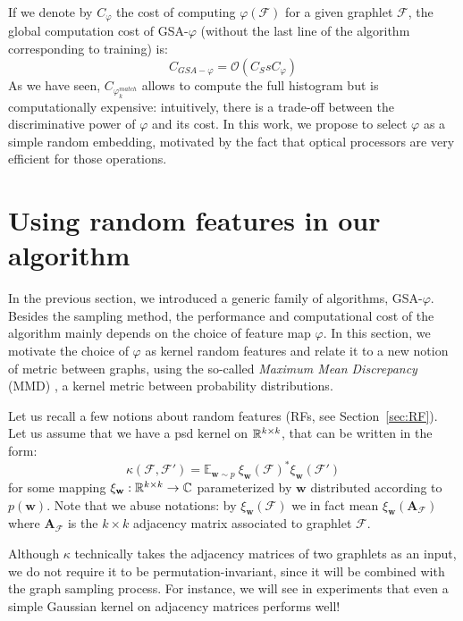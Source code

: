 If we denote by $C_\varphi$ the cost of computing $\varphi(\mathcal{F})$ for a given graphlet $\mathcal{F}$, the global computation cost of GSA-$\varphi$ (without the last line of the algorithm corresponding to training) is:
\begin{equation}
C_{GSA-\varphi} = \mathcal{O}(C_S s C_\varphi)
\end{equation}
As we have seen, $C_{\varphi^{match}_k}$ allows to compute the full histogram but is computationally expensive: intuitively, there is a trade-off between the discriminative power of $\varphi$ and its cost. In this work, we propose to select $\varphi$ as a simple random embedding, motivated by the fact that optical processors are very efficient for those operations. 

\section{Using random features in our algorithm}

In the previous section, we introduced a generic family of algorithms, GSA-$\varphi$. Besides the sampling method, the performance and computational cost of the algorithm mainly depends on the choice of feature map $\varphi$. In this section, we motivate the choice of $\varphi$ as kernel random features  and relate it to a new notion of metric between graphs, using the so-called \emph{Maximum Mean Discrepancy} (MMD) \citep{gretton}, a kernel metric between probability distributions.

Let us recall a few notions about random features (RFs, see Section~\ref{sec:RF}). Let us assume that we have a psd kernel on $\mathbb{R}^{k \times k}$, that can be written in the form:
\begin{equation}
\label{eq:random_features_3}
\kappa(\mathcal{F},\mathcal{F}')= \mathbb{E}_{\mathbf{w} \sim p}~ \xi_\mathbf{w}(\mathcal{F})^* \xi_\mathbf{w}(\mathcal{F}')
\end{equation}
for some mapping $\xi_\mathbf{w} : \mathbb{R}^{k \times k} \to \mathbb{C}$ parameterized by $\mathbf{w}$ distributed according to $p(\mathbf{w})$. Note that we abuse notations: by $\xi_\mathbf{w}(\mathcal{F})$ we in fact mean $\xi_\mathbf{w}(\mathbf{A}_\mathcal{F})$ where $\mathbf{A}_\mathcal{F}$ is the $k\times k$ adjacency matrix associated to graphlet $\mathcal{F}$. 

Although $\kappa$ technically takes the adjacency matrices of two graphlets as an input, we do not require it to be permutation-invariant, since it will be combined with the graph sampling process.  For instance, we will see in experiments that even a simple Gaussian kernel on adjacency matrices performs well!

